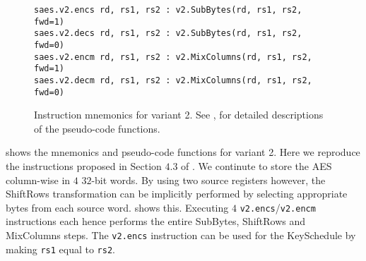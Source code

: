 
\begin{figure}
\begin{lstlisting}[language=pseudo,style=block]
saes.v2.encs rd, rs1, rs2 : v2.SubBytes(rd, rs1, rs2, fwd=1)
saes.v2.decs rd, rs1, rs2 : v2.SubBytes(rd, rs1, rs2, fwd=0)
saes.v2.encm rd, rs1, rs2 : v2.MixColumns(rd, rs1, rs2, fwd=1)
saes.v2.decm rd, rs1, rs2 : v2.MixColumns(rd, rs1, rs2, fwd=0)
\end{lstlisting}
\caption{
    Instruction mnemonics for variant 2.
    See ,  for detailed
    descriptions of the pseudo-code functions.
}
\label{fig:mnemonics:v2}
\end{figure}

 shows the mnemonics and pseudo-code functions
for variant 2.
Here we reproduce the instructions proposed in Section $4.3$ of
\cite{TilGro:06}.
We continute to store the AES column-wise in $4$ $32$-bit words.
By using two source registers however,
the ShiftRows transformation can be implicitly performed by selecting
appropriate bytes from each source word.
shows this.
Executing $4$  {\tt v2.encs}/{\tt v2.encm} instructions each hence
performs the entire SubBytes, ShiftRows and MixColumns steps.
The {\tt v2.encs} instruction can be used for the KeySchedule by
making {\tt rs1} equal to {\tt rs2}.

